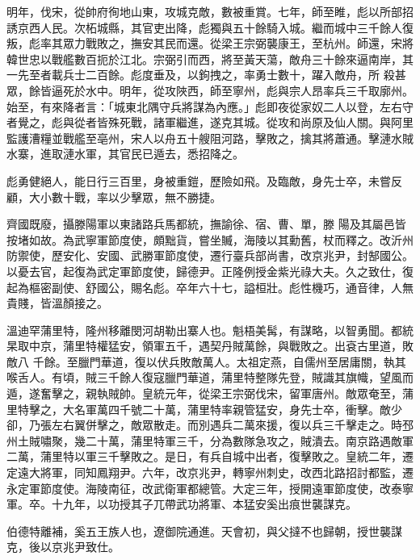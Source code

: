\begin{pinyinscope}
 明年，伐宋，從帥府徇地山東，攻城克敵，數被重賞。七年，師至睢，彪以所部招誘京西人民。次柘城縣，其官吏出降，彪獨與五十餘騎入城。繼而城中三千餘人復叛，彪率其眾力戰敗之，撫安其民而還。從梁王宗弼襲康王，至杭州。師還，宋將韓世忠以戰艦數百扼於江北。宗弼引而西，將至黃天蕩，敵舟三十餘來逼南岸，其一先至者載兵士二百餘。彪度垂及，以鉤拽之，率勇士數十，躍入敵舟，所
 殺甚眾，餘皆逼死於水中。明年，從攻陜西，師至寧州，彪與宗人昂率兵三千取廓州。始至，有來降者言：「城東北隅守兵將謀為內應。」彪即夜從家奴二人以登，左右守者覺之，彪與從者皆殊死戰，諸軍繼進，遂克其城。從攻和尚原及仙人關。與阿里監護漕糧並戰艦至亳州，宋人以舟五十艘阻河路，擊敗之，擒其將蕭通。擊漣水賊水寨，進取漣水軍，其官民已遁去，悉招降之。



 彪勇健絕人，能日行三百里，身被重鎧，歷險如飛。及臨敵，身先士卒，未嘗反顧，大小數十戰，率以少擊眾，無不勝捷。



 齊國既廢，攝滕陽軍以東諸路兵馬都統，撫諭徐、宿、曹、單，滕
 陽及其屬邑皆按堵如故。為武寧軍節度使，頗黜貨，嘗坐贓，海陵以其勳舊，杖而釋之。改沂州防禦使，歷安化、安國、武勝軍節度使，遷行臺兵部尚書，改京兆尹，封郜國公。以憂去官，起復為武定軍節度使，歸德尹。正隆例授金紫光祿大夫。久之致仕，復起為樞密副使、舒國公，賜名彪。卒年六十七，謚桓壯。彪性機巧，通音律，人無貴賤，皆溫顏接之。



 溫迪罕蒲里特，隆州移離閔河胡勒出寨人也。魁梧美髯，有謀略，以智勇聞。都統杲取中京，蒲里特權猛安，領軍五千，遇契丹賊萬餘，與戰敗之。出袞古里道，敗敵八
 千餘。至臘門華道，復以伏兵敗敵萬人。太祖定燕，自儒州至居庸關，執其喉舌人。有頃，賊三千餘人復寇臘門華道，蒲里特整隊先登，賊識其旗幟，望風而遁，遂奮擊之，親執賊帥。皇統元年，從梁王宗弼伐宋，留軍唐州。敵眾奄至，蒲里特擊之，大名軍萬四千號二十萬，蒲里特率親管猛安，身先士卒，衝擊。敵少卻，乃張左右翼併擊之，敵眾散走。而別遇兵二萬來援，復以兵三千擊走之。時邳州土賊嘯聚，幾二十萬，蒲里特軍三千，分為數隊急攻之，賊潰去。南京路遇敵軍二萬，蒲里特以軍三千擊敗之。是日，有兵自城中出者，復擊敗之。皇統二年，遷
 定遠大將軍，同知鳳翔尹。六年，改京兆尹，轉寧州刺史，改西北路招討都監，遷永定軍節度使。海陵南征，改武衛軍都總管。大定三年，授開遠軍節度使，改泰寧軍。卒。十九年，以功授其子兀帶武功將軍、本猛安奚出痕世襲謀克。



 伯德特離補，奚五王族人也，遼御院通進。天會初，與父撻不也歸朝，授世襲謀克，後以京兆尹致仕。




\end{pinyinscope}
